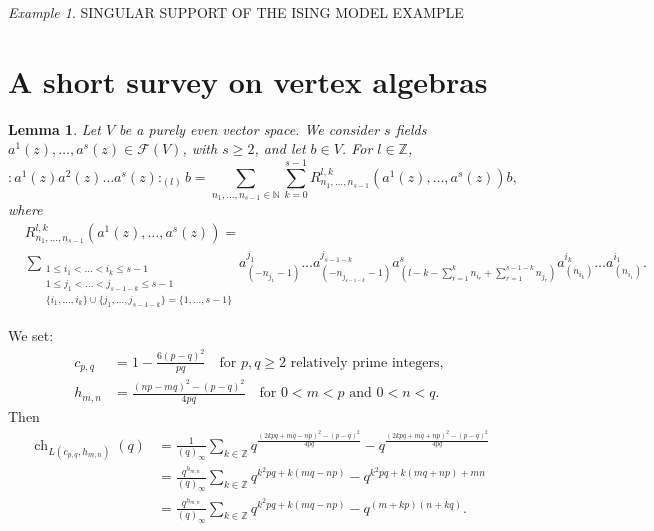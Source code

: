 \documentclass[a4paper, 12pt, reqno]{amsart}
\newtheorem{lemma}[theorem]{Lemma}
\theoremstyle{remark}
\newtheorem{example}[theorem]{Example}
\DeclareMathOperator{\ch}{ch}
\begin{document}
\begin{example}
  \label{exa:6}
  SINGULAR SUPPORT OF THE ISING MODEL EXAMPLE
\end{example}

\section{A short survey on vertex algebras}
\label{sec:short-survey-vertex}

\begin{lemma}
  \label{lmm:1}
  Let $V$ be a purely even vector space.
  We consider $s$ fields $a^1(z), \dots, a^s(z) \in \mathcal{F}(V)$, with $s \ge 2$, and let $b \in V$.
  For $l \in \mathbb{Z}$,
  \begin{equation*}
    :a^1(z)a^2(z)\dots a^s(z):_{(l)}b = \sum_{n_1, \dots, n_{s - 1} \in \mathbb{N}}\sum_{k = 0}^{s - 1}R^{l, k}_{n_1, \dots, n_{s - 1}}(a^1(z), \dots, a^s(z))b,
  \end{equation*}
  where
  \begin{align*}
    &R^{l, k}_{n_1, \dots, n_{s - 1}}(a^1(z), \dots, a^s(z)) = \\
    &\sum_{\substack{1 \le i_1 < \dots < i_k \le s - 1 \\ 1 \le j_1 < \dots < j_{s - 1 - k} \le s - 1 \\ \{i_1, \dots, i_k\} \cup \{j_1, \dots, j_{s - 1 - k}\} = \{1, \dots, s - 1\}}}a^{j_1}_{(-n_{j_1} - 1)}\dots a^{j_{s - 1 - k}}_{(-n_{j_{s - 1 - k}} - 1)}a^s_{(l - k - \sum_{r = 1}^k n_{i_r} + \sum_{r = 1}^{s - 1 - k}n_{j_r})}a^{i_k}_{(n_{i_k})}\dots a^{i_1}_{(n_{i_1})}.
  \end{align*}
\end{lemma}

We set:
\begin{align*}
  c_{p, q} &= 1 - \frac{6(p - q)^2}{pq} \quad \text{for $p, q \ge 2$ relatively prime integers}, \\
  h_{m, n} &= \frac{(np - mq)^2 - (p - q)^2}{4pq} \quad \text{for $0 < m < p$ and $0 < n < q$.}
\end{align*}
Then
\begin{align*}
  \ch_{L(c_{p, q}, h_{m, n})}(q) &= \frac{1}{(q)_{\infty}}\sum_{k \in \mathbb{Z}}q^{\frac{(2kpq + mq - np)^2 - (p - q)^2}{4pq}} - q^{\frac{(2kpq + mq + np)^2 - (p - q)^2}{4pq}} \\
                                 &= \frac{q^{h_{m, n}}}{(q)_{\infty}}\sum_{k \in \mathbb{Z}}q^{k^2pq + k(mq - np)}-q^{k^2pq + k(mq + np) + mn} \\
                                 &= \frac{q^{h_{m, n}}}{(q)_{\infty}}\sum_{k \in \mathbb{Z}}q^{k^2pq + k(mq - np)}-q^{(m + kp)(n + kq)}.
\end{align*}
\end{document}
